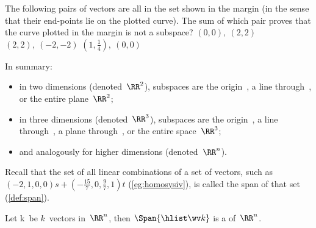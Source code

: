 \begin{activity}
The following pairs of vectors are all in the set shown in the margin (in the sense that their end-points lie on the plotted curve).  
%
The sum of which pair proves that the curve plotted in the margin is not a subspace?
{\((0,0),\ (2,2)\)}
{\((2,2),\ (-2,-2)\)}
{\((1,\frac14),\ (0,0)\)}
\end{activity}




In summary:
\begin{itemize}
\item in two dimensions (denoted~\(\RR^2\)), subspaces are the origin~\ov, a line through~\ov, or the entire plane~\(\RR^2\);
\item in three dimensions (denoted~\(\RR^3\)), subspaces are the origin~\ov, a line through~\ov, a plane through~\ov, or the entire space~\(\RR^3\);
\item and analogously for higher dimensions (denoted~\(\RR^n\)).
\end{itemize}


Recall that the set of all linear combinations of a set of vectors, such as \((-2,1,0,0)s+(-\frac{15}7,0,\frac97,1)t\) (\cref{eg:homosysiv}), is called the span of that set (\cref{def:span}).

\begin{theorem} \label{thm:spansubs} 
Let \hlist\wv k\ be \(k\)~vectors in~\(\RR^n\),
then \(\Span\{\hlist\wv k\}\) is a  of~\(\RR^n\).
\end{theorem}

